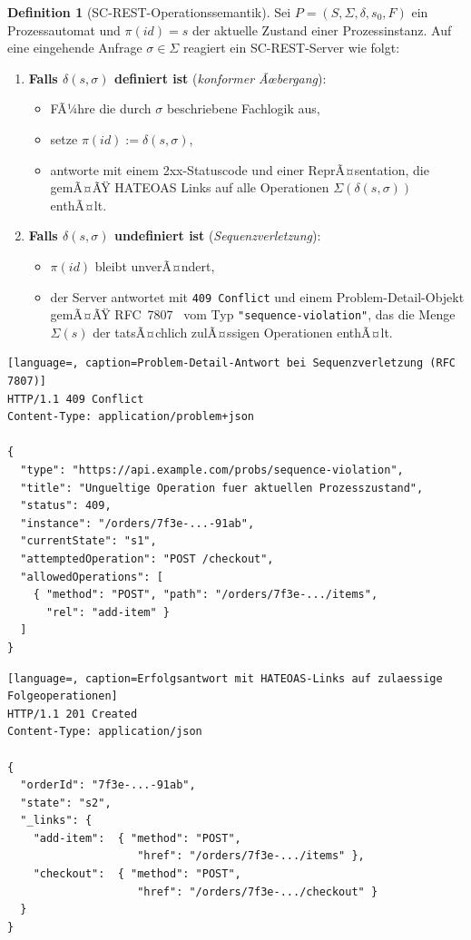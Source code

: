 ﻿\documentclass[a4paper,12pt]{article}
\theoremstyle{definition}
\newtheorem{definition}{Definition}
\begin{document}
\begin{definition}[SC-REST-Operationssemantik]
	\label{def:sc-rest-server}
	Sei $P = (S,\Sigma,\delta,s_0,F)$ ein Prozessautomat und $\pi(id) = s$ der aktuelle
	Zustand einer Prozessinstanz. Auf eine eingehende Anfrage $\sigma \in \Sigma$
	reagiert ein SC-REST-Server wie folgt:
	\begin{enumerate}
		\item \textbf{Falls $\delta(s,\sigma)$ definiert ist} (\emph{konformer Ãœbergang}):
		\begin{itemize}
			\item FÃ¼hre die durch $\sigma$ beschriebene Fachlogik aus,
			\item setze $\pi(id) := \delta(s,\sigma)$,
			\item antworte mit einem 2xx-Statuscode und einer ReprÃ¤sentation, die
			      gemÃ¤ÃŸ HATEOAS Links auf alle Operationen
			      $\Sigma(\delta(s,\sigma))$ enthÃ¤lt.
		\end{itemize}
		\item \textbf{Falls $\delta(s,\sigma)$ undefiniert ist} (\emph{Sequenzverletzung}):
		\begin{itemize}
			\item $\pi(id)$ bleibt unverÃ¤ndert,
			\item der Server antwortet mit \texttt{409 Conflict} und einem
			      Problem-Detail-Objekt gemÃ¤ÃŸ RFC~7807~\cite{rfc7807} vom Typ
			      \texttt{"{}sequence-violation"{}}, das die Menge $\Sigma(s)$ der
			      tatsÃ¤chlich zulÃ¤ssigen Operationen enthÃ¤lt.
		\end{itemize}
	\end{enumerate}
\end{definition}

\begin{lstlisting}[language=, caption=Problem-Detail-Antwort bei Sequenzverletzung (RFC 7807)]
HTTP/1.1 409 Conflict
Content-Type: application/problem+json

{
  "type": "https://api.example.com/probs/sequence-violation",
  "title": "Ungueltige Operation fuer aktuellen Prozesszustand",
  "status": 409,
  "instance": "/orders/7f3e-...-91ab",
  "currentState": "s1",
  "attemptedOperation": "POST /checkout",
  "allowedOperations": [
    { "method": "POST", "path": "/orders/7f3e-.../items",
      "rel": "add-item" }
  ]
}
\end{lstlisting}

\begin{lstlisting}[language=, caption=Erfolgsantwort mit HATEOAS-Links auf zulaessige Folgeoperationen]
HTTP/1.1 201 Created
Content-Type: application/json

{
  "orderId": "7f3e-...-91ab",
  "state": "s2",
  "_links": {
    "add-item":  { "method": "POST",
                    "href": "/orders/7f3e-.../items" },
    "checkout":  { "method": "POST",
                    "href": "/orders/7f3e-.../checkout" }
  }
}
\end{lstlisting}
\end{document}
